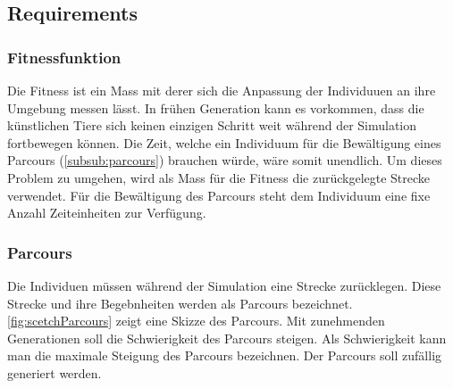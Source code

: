   \subsection{Requirements}

    \subsubsection{Fitnessfunktion}
      Die Fitness ist ein Mass mit derer sich die Anpassung der Individuuen an ihre Umgebung messen lässt.
      In frühen Generation kann es vorkommen, dass die künstlichen Tiere sich keinen einzigen Schritt weit während der Simulation
      fortbewegen können. Die Zeit, welche ein Individuum für die Bewältigung eines Parcours (\vref{subsub:parcours}) brauchen würde, wäre somit unendlich.
      Um dieses Problem zu umgehen, wird als Mass für die Fitness die zurückgelegte Strecke verwendet.
      Für die Bewältigung des Parcours steht dem Individuum eine fixe Anzahl Zeiteinheiten zur Verfügung.

    \subsubsection{Parcours\label{subsub:parcours}}
      Die Individuen müssen während der Simulation eine Strecke zurücklegen.
      Diese Strecke und ihre Begebnheiten werden als Parcours bezeichnet.
      \vref{fig:scetchParcours} zeigt eine Skizze des Parcours.
      Mit zunehmenden Generationen soll die Schwierigkeit des Parcours steigen.
      Als Schwierigkeit kann man die maximale Steigung des Parcours bezeichnen.
      Der Parcours soll zufällig generiert werden.

